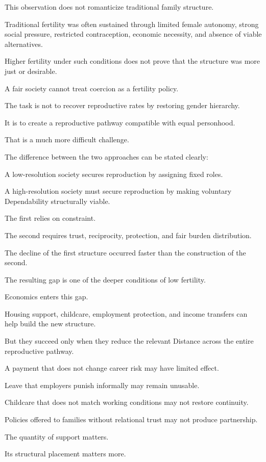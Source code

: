 This observation does not romanticize traditional family structure.

Traditional fertility was often sustained through limited female autonomy, strong social pressure, restricted contraception, economic necessity, and absence of viable alternatives.

Higher fertility under such conditions does not prove that the structure was more just or desirable.

A fair society cannot treat coercion as a fertility policy.

The task is not to recover reproductive rates by restoring gender hierarchy.

It is to create a reproductive pathway compatible with equal personhood.

That is a much more difficult challenge.

The difference between the two approaches can be stated clearly:

A low-resolution society secures reproduction by assigning fixed roles.

A high-resolution society must secure reproduction by making voluntary Dependability structurally viable.

The first relies on constraint.

The second requires trust, reciprocity, protection, and fair burden distribution.

The decline of the first structure occurred faster than the construction of the second.

The resulting gap is one of the deeper conditions of low fertility.

Economics enters this gap.

Housing support, childcare, employment protection, and income transfers can help build the new structure.

But they succeed only when they reduce the relevant Distance across the entire reproductive pathway.

A payment that does not change career risk may have limited effect.

Leave that employers punish informally may remain unusable.

Childcare that does not match working conditions may not restore continuity.

Policies offered to families without relational trust may not produce partnership.

The quantity of support matters.

Its structural placement matters more.

